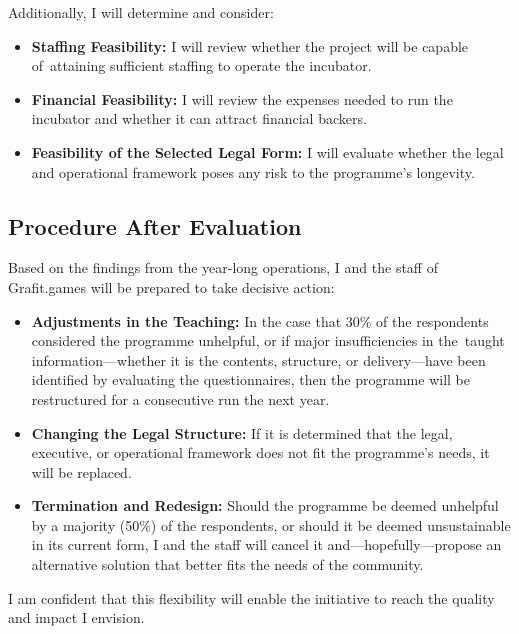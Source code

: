 Additionally, I will determine and consider:
\begin{itemize}
    \item \textbf{Staffing Feasibility:} I will review whether the project will be capable of~attaining sufficient staffing to operate the incubator.
    \item \textbf{Financial Feasibility:} I will review the expenses needed to run the incubator and whether it can attract financial backers.
    \item \textbf{Feasibility of the Selected Legal Form:} I will evaluate whether the legal and operational framework poses any risk to the programme’s longevity.
\end{itemize}

\subsection{Procedure After Evaluation}
Based on the findings from the year-long operations, I and the staff of Grafit.games will be prepared to take decisive action:
\begin{itemize}
    \item \textbf{Adjustments in the Teaching:} In the case that 30\% of the respondents considered the programme unhelpful, or if major insufficiencies in the~taught information---whether it is the contents, structure, or delivery---have been identified by evaluating the questionnaires, then the programme will be restructured for a consecutive run the next year.
    \item \textbf{Changing the Legal Structure:} If it is determined that the legal, executive, or operational framework does not fit the programme’s needs, it will be replaced.
    \item \textbf{Termination and Redesign:} Should the programme be deemed unhelpful by a majority (50\%) of the respondents, or should it be deemed unsustainable in its current form, I and the staff will cancel it and---hopefully---propose an alternative solution that better fits the needs of the community.
\end{itemize}

I am confident that this flexibility will enable the initiative to reach the quality and impact I envision.
